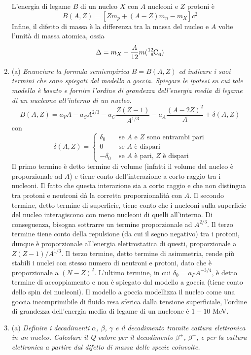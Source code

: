 \documentclass{article}
\renewcommand{\a}{(a)}
\renewcommand{\t}[1]{\textit{ #1}}
\begin{document}
\begin{enumerate}
	L'energia di legame $B$ di un nucleo $X$ con $A$ nucleoni e $Z$ protoni è
	\[B(A,Z)=[Zm_p+(A-Z)m_n-m_X] c^2\]
	Infine, il difetto di massa è la differenza tra la massa del nucleo e $A$ volte l'unità di massa atomica, ossia
	\[\Delta=m_X-\frac{A}{12}m(\tensor*[^{12}_6]{\textrm{C}}{_6})\]
\item\a\t{Enunciare la formula semiempirica $B=B(A,Z)$ ed indicare i suoi termini che sono
	spiegati dal modello a goccia. Spiegare le ipotesi su cui tale modello è basato e
	fornire l'ordine di grandezza dell’energia media di legame di un nucleone
	all’interno di un nucleo.}
\[B(A,Z)=a_VA-a_SA^{2/3}-a_C\frac{Z(Z-1)}{A^{1/3}}-a_A\frac{(A-2Z)^2}{A}+\delta(A,Z)\]
con\[\delta(A,Z)=\begin{cases}
\delta _0&\textrm{ se $A$ e $Z$ sono entrambi pari}\\0&\textrm{ se $A$ è dispari}\\-\delta_0&\textrm{ se $A$ è pari, $Z$ è dispari}
\end{cases}\]
Il primo termine è detto termine di volume (infatti il volume del nucleo è proporzionale ad $A$) e tiene conto dell'interazione a corto raggio tra i nucleoni. Il fatto che questa interazione sia a corto raggio e che non distingua tra protoni e neutroni dà la corretta proporzionalità con $A$. Il secondo termine, detto termine di superficie, tiene conto che i nucleoni sulla superficie del nucleo interagiscono con meno nucleoni di quelli all'interno. Di conseguenza, bisogna sottrarre un termine proporzionale ad $A^{2/3}$. Il terzo termine tiene conto della repulsione (da cui il segno negativo) tra i protoni, dunque è proporzionale all'energia elettrostatica di questi, proporzionale a $Z(Z-1)/A^{1/3}$. Il terzo termine, detto termine di asimmetria, rende più stabili i nuclei con stesso numero di neutroni e protoni, dato che è proporzionale a $(N-Z)^2$. L'ultimo termine, in cui $\delta_0=a_PA^{-3/4}$, è detto termine di accoppiamento e non è spiegato dal modello a goccia (tiene conto dello spin dei nucleoni). Il modello a goccia modellizza il nucleo come una goccia incomprimibile di fluido resa sferica dalla tensione superficiale, l'ordine di grandezza dell'energia media di legame di un nucleone è $1-10$ MeV. 
\item\a\t{Definire i decadimenti $\alpha$, $\beta$, $\gamma$ e il decadimento tramite cattura elettronica in un
	nucleo. Calcolare il Q-valore per il decadimento $\beta^+$, $\beta^-$, e per la cattura elettronica
	a partire dal difetto di massa delle specie coinvolte.}
\begin{itemize}

\end{itemize}
\end{enumerate}
\end{document}
